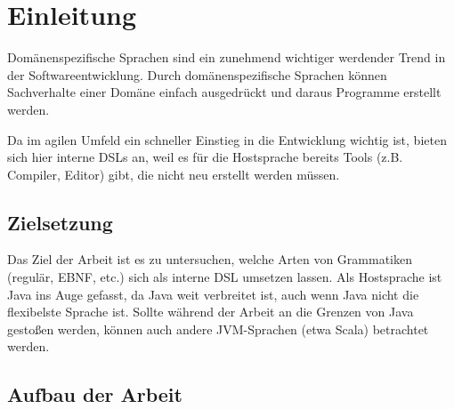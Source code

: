 \documentclass[../InterneDSLs.tex]{subfiles}
\begin{document}
\chapter{Einleitung}
Domänenspezifische Sprachen sind ein zunehmend wichtiger werdender Trend in der Softwareentwicklung. Durch domänenspezifische Sprachen können Sachverhalte einer Domäne einfach ausgedrückt und daraus Programme erstellt werden. 

Da im agilen Umfeld ein schneller Einstieg in die Entwicklung wichtig ist, bieten sich hier interne \acsp{DSL} an, weil es für die Hostsprache bereits Tools (z.B. Compiler, Editor) gibt, die nicht neu erstellt werden müssen.


\section{Zielsetzung}
Das Ziel der Arbeit ist es zu untersuchen, welche Arten von Grammatiken (regulär, \ac{EBNF}, etc.) sich als interne DSL umsetzen lassen. Als Hostsprache ist Java ins Auge gefasst, da Java weit verbreitet ist, auch wenn Java nicht die flexibelste Sprache ist. Sollte während der Arbeit an die Grenzen von Java gestoßen werden, können auch andere \ac{JVM}-Sprachen (etwa Scala) betrachtet werden.


\section{Aufbau der Arbeit}
\end{document}
